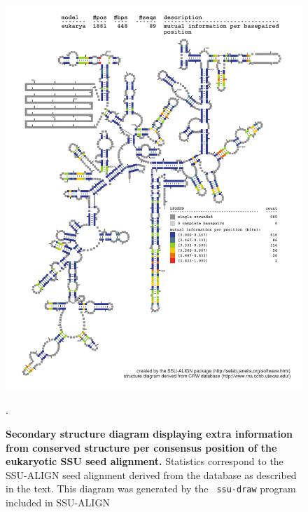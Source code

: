 \begin{figure}
\begin{center}
\includegraphics[width=5.64in]{Figures/eukarya-0p1-mutinfo}
\end{center}
\caption[Secondary structure diagram displaying extra information 
  from conserved structure per consensus position of the eukaryotic SSU seed
  alignment]{\textbf{Secondary structure diagram displaying extra
  information from conserved structure per consensus position of the eukaryotic SSU seed
  alignment.} Statistics correspond to the SSU-ALIGN seed
  alignment derived from the  database \cite{CannoneGutell02}
  as described in the text. This diagram was generated by the {\tt
  ssu-draw} program included in SSU-ALIGN}.
\label{fig:euksinfo}
\end{figure}

\newpage 

